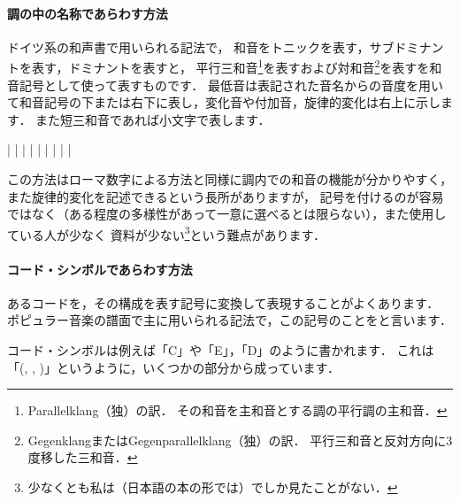 \documentclass[dvipdfmx,uplatex,b5paper,openany,jbase=12Q,nomag*,textwidth-limit=44%
               ]{gachimuchi}
\begin{document}
\paragraph{調の中の名称であらわす方法}
ドイツ系の和声書で用いられる記法で，
和音をトニックを表す，サブドミナントを表す，ドミナントを表すと，
平行三和音\footnote{%
  Parallelklang（独）の訳．
  その和音を主和音とする調の平行調の主和音．
}を表すおよび対和音\footnote{%
  GegenklangまたはGegenparallelklang（独）の訳．
  平行三和音と反対方向に3度移した三和音．
}を表すを和音記号として使って表すものです．
最低音は表記された音名からの音度を用いて和音記号の下または右下に表し，変化音や付加音，旋律的変化は右上に示します．
また短三和音であれば小文字で表します．
\begin{floatMusic}[pos=ht,width=0.9\linewidth]
  \Startpiece%
  \Notes%
  \zchordsu{}|%
  \en\Notes%
  |%
  \en\Notes%
  |%
  \en\bar
  \Notes%
  \zchordsu{}|%
  \en\Notes%
  \zchordsu{}|%
  \en\Notes%
  \zchordsu{}|%
  \en\Notes%
  \zchordsu{}|%
  \en\Notes%
  \zchordsu{}|%
  \en\setdoublebar%
  \endpiece%
\end{floatMusic}

この方法はローマ数字による方法と同様に調内での和音の機能が分かりやすく，
また旋律的変化を記述できるという長所がありますが，
記号を付けるのが容易ではなく（ある程度の多様性があって一意に選べるとは限らない），また使用している人が少なく
資料が少ない\footnote{
  少なくとも私は（日本語の本の形では）でしか見たことがない．
}という難点があります．

\paragraph{コード・シンボルであらわす方法}
あるコードを，その構成を表す記号に変換して表現することがよくあります．
ポピュラー音楽の譜面で主に用いられる記法で，この記号のことをと言います．

コード・シンボルは例えば「C」や「E\aFlat{}」，「D\Min{}」のように書かれます．
これは「\txCirc(\Min , \Dimt , \Aug)\lhsc\txSqr\txTri」というように，いくつかの部分から成っています．
\end{document}

